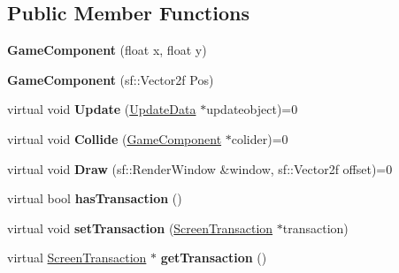 \subsection*{Public Member Functions}
\begin{DoxyCompactItemize}
\item 
\hypertarget{class_game_component_ac1eefc88d46d10f869939a7bab5a498b}{{\bfseries Game\-Component} (float x, float y)}\label{class_game_component_ac1eefc88d46d10f869939a7bab5a498b}

\item 
\hypertarget{class_game_component_a3338305ddce8cb75296ba23e1c29cf0f}{{\bfseries Game\-Component} (sf\-::\-Vector2f Pos)}\label{class_game_component_a3338305ddce8cb75296ba23e1c29cf0f}

\item 
\hypertarget{class_game_component_a01b3434d7bf6a63552e7ea4fd68744fe}{virtual void {\bfseries Update} (\hyperlink{class_update_data}{Update\-Data} $\ast$updateobject)=0}\label{class_game_component_a01b3434d7bf6a63552e7ea4fd68744fe}

\item 
\hypertarget{class_game_component_a333932780a30df552333d02669c593bc}{virtual void {\bfseries Collide} (\hyperlink{class_game_component}{Game\-Component} $\ast$colider)=0}\label{class_game_component_a333932780a30df552333d02669c593bc}

\item 
\hypertarget{class_game_component_a63c3e40531340490712b789d0d821743}{virtual void {\bfseries Draw} (sf\-::\-Render\-Window \&window, sf\-::\-Vector2f offset)=0}\label{class_game_component_a63c3e40531340490712b789d0d821743}

\item 
\hypertarget{class_game_component_a5dc0e3d5d8aa6be47d4392dc0ebe566d}{virtual bool {\bfseries has\-Transaction} ()}\label{class_game_component_a5dc0e3d5d8aa6be47d4392dc0ebe566d}

\item 
\hypertarget{class_game_component_a5473b7d5e5c1e6f6c94e1d665cb4623c}{virtual void {\bfseries set\-Transaction} (\hyperlink{class_screen_transaction}{Screen\-Transaction} $\ast$transaction)}\label{class_game_component_a5473b7d5e5c1e6f6c94e1d665cb4623c}

\item 
\hypertarget{class_game_component_a84b6f548c5045a179b9d2c33c3944f10}{virtual \hyperlink{class_screen_transaction}{Screen\-Transaction} $\ast$ {\bfseries get\-Transaction} ()}\label{class_game_component_a84b6f548c5045a179b9d2c33c3944f10}


\end{DoxyCompactItemize}
